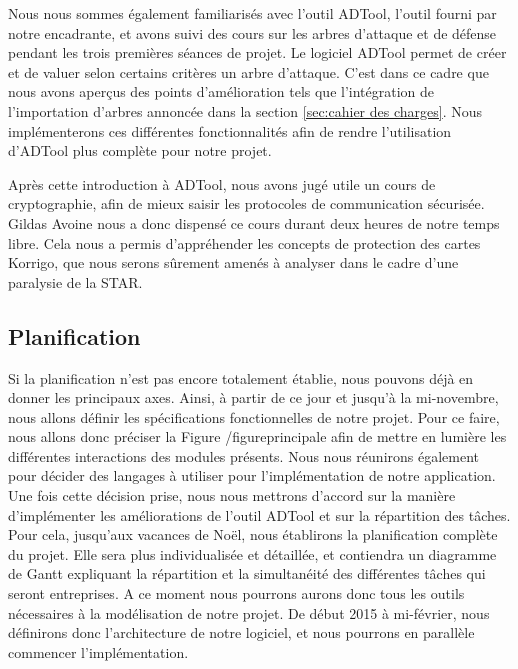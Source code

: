 	    Nous nous sommes également familiarisés avec l'outil ADTool, l'outil fourni par notre encadrante, et avons suivi des cours sur les arbres d'attaque et de défense pendant les trois premières séances de projet. Le logiciel ADTool permet de créer et de valuer selon certains critères un arbre d'attaque. C'est dans ce cadre que nous avons aperçus des points d'amélioration tels que l'intégration de l'importation d'arbres annoncée dans la section \ref{sec:cahier des charges}. Nous implémenterons ces différentes fonctionnalités afin de rendre l'utilisation d'ADTool plus complète pour notre projet.
	    
	    Après cette introduction à ADTool, nous avons jugé utile un cours de cryptographie, afin de mieux saisir les protocoles de communication sécurisée. Gildas Avoine nous a donc dispensé ce cours durant deux heures de notre temps libre. Cela nous a permis d'appréhender les concepts de protection des cartes Korrigo, que nous serons sûrement amenés à analyser dans le cadre d'une paralysie de la STAR.
			
				\subsection{Planification}
		Si la planification n'est pas encore totalement établie, nous pouvons déjà en donner les principaux axes.
		Ainsi, à partir de ce jour et jusqu'à la mi-novembre, nous allons définir les spécifications fonctionnelles de notre projet.
		Pour ce faire, nous allons donc préciser la Figure /figureprincipale afin de mettre en lumière les différentes interactions des modules présents. Nous nous réunirons également pour décider des langages à utiliser pour l'implémentation de notre application.
		Une fois cette décision prise, nous nous mettrons d'accord sur la manière d'implémenter les améliorations de l'outil ADTool et sur la répartition des tâches.
		Pour cela, jusqu'aux vacances de Noël, nous établirons la planification complète du projet. Elle sera plus individualisée et détaillée, et contiendra un diagramme de Gantt expliquant la répartition et la simultanéité des différentes tâches qui seront entreprises.
		A ce moment nous pourrons aurons donc tous les outils nécessaires à la modélisation de notre projet.
		De début 2015 à mi-février, nous définirons donc l'architecture de notre logiciel, et nous pourrons en parallèle commencer l'implémentation.

